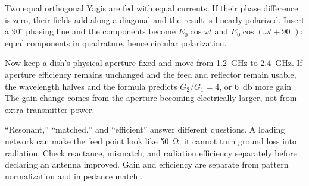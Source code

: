 \begin{workedbox}
Two equal orthogonal Yagis are fed with equal currents.  If their phase difference
is zero, their fields add along a diagonal and the result is linearly polarized.
Insert a \(90^\circ\) phasing line and the components become
\(E_0\cos\omega t\) and \(E_0\cos(\omega t+90^\circ)\): equal components in
quadrature, hence circular polarization.

Now keep a dish's physical aperture fixed and move from
\SI{1.2}{\giga\hertz} to \SI{2.4}{\giga\hertz}. If aperture efficiency remains
unchanged and the feed and reflector remain usable, the wavelength halves and the
formula predicts \(G_2/G_1=4\), or \SI{6}{\decibel} more gain
\cite[pp.~407--409]{free2022rfmicrowave}. The gain change comes from the aperture
becoming electrically larger, not from extra transmitter power.
\end{workedbox}

\begin{mistakebox}
``Resonant,'' ``matched,'' and ``efficient'' answer different questions.  A
loading network can make the feed point look like \SI{50}{\ohm}; it cannot turn
ground loss into radiation.  Check reactance, mismatch, and radiation efficiency
separately before declaring an antenna improved.
Gain and efficiency are separate from pattern normalization and impedance match
\cite[pp.~359--363]{free2022rfmicrowave}.
\end{mistakebox}
